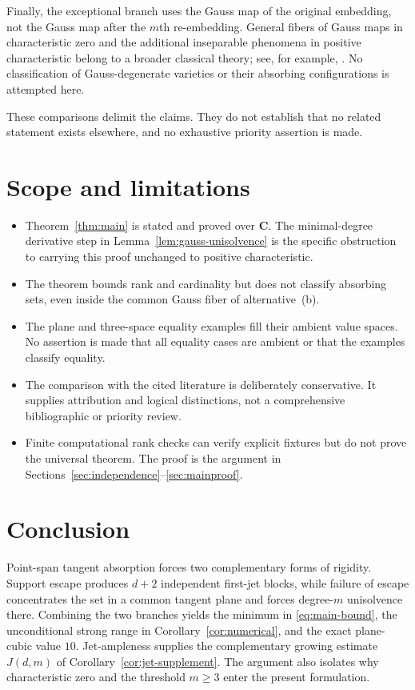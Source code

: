 \documentclass[11pt]{article}
\newcommand{\CC}{\mathbf C}
\begin{document}
Finally, the exceptional branch uses the Gauss map of the original embedding,
not the Gauss map after the $m$th re-embedding.  General fibers of Gauss maps
in characteristic zero and the additional inseparable phenomena in positive
characteristic belong to a broader classical theory; see, for example,
\cite{Furukawa2013,FurukawaIto2017}.  No classification of Gauss-degenerate
varieties or their absorbing configurations is attempted here.

These comparisons delimit the claims.  They do not establish that no related
statement exists elsewhere, and no exhaustive priority assertion is made.

\section{Scope and limitations}\label{sec:scope}

\begin{itemize}
\item Theorem~\ref{thm:main} is stated and proved over $\CC$.  The
minimal-degree derivative step in Lemma~\ref{lem:gauss-unisolvence} is the
specific obstruction to carrying this proof unchanged to positive
characteristic.
\item The theorem bounds rank and cardinality but does not classify absorbing
sets, even inside the common Gauss fiber of alternative~\textup{(b)}.
\item The plane and three-space equality examples fill their ambient value
spaces.  No assertion is made that all equality cases are ambient or that the
examples classify equality.
\item The comparison with the cited literature is deliberately conservative.
It supplies attribution and logical distinctions, not a comprehensive
bibliographic or priority review.
\item Finite computational rank checks can verify explicit fixtures but do
not prove the universal theorem.  The proof is the argument in
Sections~\ref{sec:independence}--\ref{sec:mainproof}.
\end{itemize}

\section{Conclusion}

Point-span tangent absorption forces two complementary forms of rigidity.
Support escape produces $d+2$ independent first-jet blocks, while failure of
escape concentrates the set in a common tangent plane and forces degree-$m$
unisolvence there.  Combining the two branches yields the minimum in
\eqref{eq:main-bound}, the unconditional strong range in
Corollary~\ref{cor:numerical}, and the exact plane-cubic value $10$.
Jet-ampleness supplies the complementary growing estimate $J(d,m)$ of
Corollary~\ref{cor:jet-supplement}.  The argument also isolates why
characteristic zero and the threshold $m\geq3$ enter the present formulation.
\end{document}
